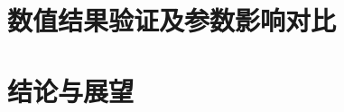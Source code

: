 \documentclass[master,xetex]{thuthesis}
\begin{document}
\chapter{数值结果验证及参数影响对比}



\chapter{结论与展望}


\backmatter







%

\begin{appendix}
%

%
%
\end{appendix}

%
\end{document}
